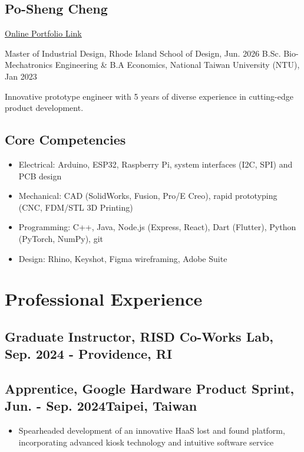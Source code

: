 \documentclass[12pt]{article}
\begin{document}
\begin{multicols}{2}
    \section*{Po-Sheng Cheng}
    \href{https://bencer3283.github.io/art/}{\underline{Online Portfolio Link}}
    
    \columnbreak
    {\sffamily \small \noindent
    Master of Industrial Design, Rhode Island School of Design, Jun. 2026 \newline
    B.Sc. Bio-Mechatronics Engineering \& \newline B.A Economics, National Taiwan University (NTU), Jan 2023
    }
\end{multicols}
{\small \noindent Innovative prototype engineer with 5 years of diverse experience in cutting-edge product development.}
\subsection*{Core Competencies}
{ \small \begin{itemize}
    \item Electrical: Arduino, ESP32, Raspberry Pi, system interfaces (I2C, SPI) and PCB design
    \item Mechanical: CAD (SolidWorks, Fusion, Pro/E Creo), rapid prototyping (CNC, FDM/STL 3D Printing)
    \item Programming: C++, Java, Node.js (Express, React), Dart (Flutter), Python (PyTorch, NumPy), git
    \item Design: Rhino, Keyshot, Figma wireframing, Adobe Suite
\end{itemize}}
    \section*{Professional Experience}
    \subsection*{Graduate Instructor, RISD Co-Works Lab, Sep. 2024 -  \hfill Providence, RI}
    
    \subsection*{Apprentice, Google Hardware Product Sprint, Jun. - Sep. 2024\hfill Taipei, Taiwan}
        { \small
        \begin{itemize}
            \item Spearheaded development of an innovative HaaS lost and found platform, incorporating advanced kiosk technology and intuitive software service
        \end{itemize}
        }
\end{document}
